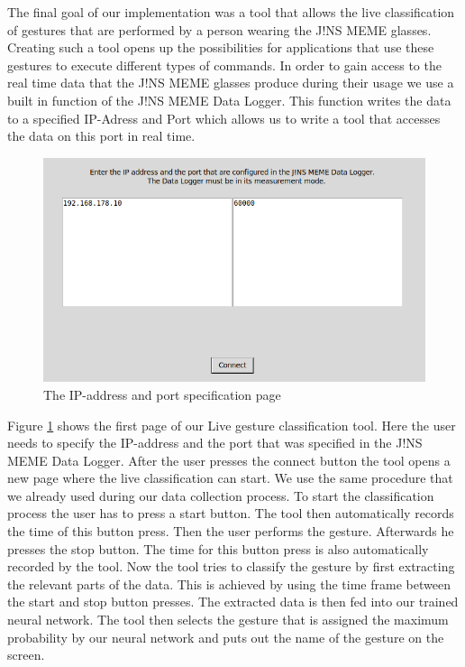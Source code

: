 \documentclass[runningheads]{llncs}
\begin{document}
The final goal of our implementation was a tool that allows the live classification of gestures that are performed by a person wearing the J!NS MEME glasses. Creating such a tool opens up the possibilities for applications that use these gestures to execute different types of commands. In order to gain access to the real time data that the J!NS MEME glasses produce during their usage we use a built in function of the J!NS MEME Data Logger. This function writes the data to a specified IP-Adress and Port which allows us to write a tool that accesses the data on this port in real time.
\begin{figure}
\centering
\includegraphics[width=\textwidth]{Live_Classification_IP.png}
\caption{The IP-address and port specification page}
\label{fig:ipandport}
\end{figure}
Figure \ref{fig:ipandport} shows the first page of our Live gesture classification tool. Here the user needs to specify the IP-address and the port that was specified in the J!NS MEME Data Logger. After the user presses the connect button the tool opens a new page where the live classification can start. We use the same procedure that we already used during our data collection process. To start the classification process the user has to press a start button. The tool then automatically records the time of this button press. Then the user performs the gesture. Afterwards he presses the stop button. The time for this button press is also automatically recorded by the tool. Now the tool tries to classify the gesture by first extracting the relevant parts of the data. This is achieved by using the time frame between the start and stop button presses. The extracted data is then fed into our trained neural network. The tool then selects the gesture that is assigned the maximum probability by our neural network and puts out the name of the gesture on the screen.
\end{document}

